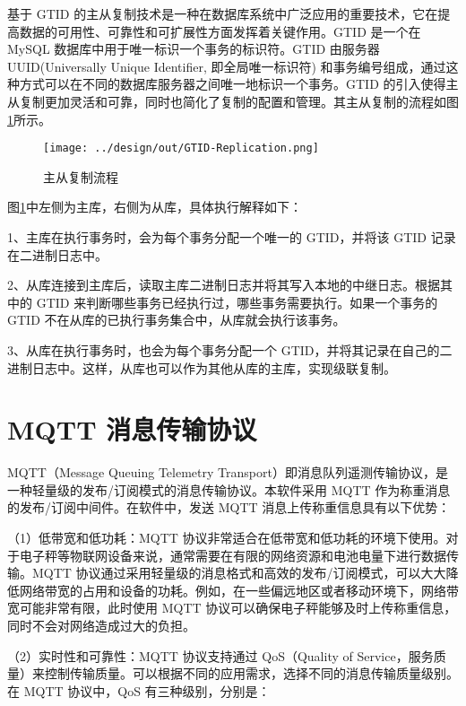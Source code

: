 基于 GTID 的主从复制技术是一种在数据库系统中广泛应用的重要技术，它在提高数据的可用性、可靠性和可扩展性方面发挥着关键作用。GTID 是一个在 MySQL 数据库中用于唯一标识一个事务的标识符。GTID 由服务器 UUID(Universally Unique Identifier, 即全局唯一标识符) 和事务编号组成，通过这种方式可以在不同的数据库服务器之间唯一地标识一个事务。GTID 的引入使得主从复制更加灵活和可靠，同时也简化了复制的配置和管理。其主从复制的流程如图\ref{fig:GTID-Replication}所示。

\begin{figure}[H]
    \centering
    \texttt{[image: ../design/out/GTID-Replication.png]}
    \caption{主从复制流程}
    \label{fig:GTID-Replication}
\end{figure}

图\ref{fig:GTID-Replication}中左侧为主库，右侧为从库，具体执行解释如下：

1、主库在执行事务时，会为每个事务分配一个唯一的 GTID，并将该 GTID 记录在二进制日志中。

2、从库连接到主库后，读取主库二进制日志并将其写入本地的中继日志。根据其中的 GTID 来判断哪些事务已经执行过，哪些事务需要执行。如果一个事务的 GTID 不在从库的已执行事务集合中，从库就会执行该事务。

3、从库在执行事务时，也会为每个事务分配一个 GTID，并将其记录在自己的二进制日志中。这样，从库也可以作为其他从库的主库，实现级联复制\cite{MySQL-Liu2022}。

\section{MQTT 消息传输协议}\label{sec:mqtt}

MQTT（Message Queuing Telemetry Transport）即消息队列遥测传输协议，是一种轻量级的发布/订阅模式的消息传输协议。本软件采用 MQTT 作为称重消息的发布/订阅中间件。在软件中，发送 MQTT 消息上传称重信息具有以下优势：

（1）低带宽和低功耗：MQTT 协议非常适合在低带宽和低功耗的环境下使用。对于电子秤等物联网设备来说，通常需要在有限的网络资源和电池电量下进行数据传输。MQTT 协议通过采用轻量级的消息格式和高效的发布/订阅模式，可以大大降低网络带宽的占用和设备的功耗。例如，在一些偏远地区或者移动环境下，网络带宽可能非常有限，此时使用 MQTT 协议可以确保电子秤能够及时上传称重信息，同时不会对网络造成过大的负担\cite{Jia2015}。

（2）实时性和可靠性：MQTT 协议支持通过 QoS（Quality of Service，服务质量）来控制传输质量。可以根据不同的应用需求，选择不同的消息传输质量级别。在 MQTT 协议中，QoS 有三种级别\cite{Jia2015}，分别是：

